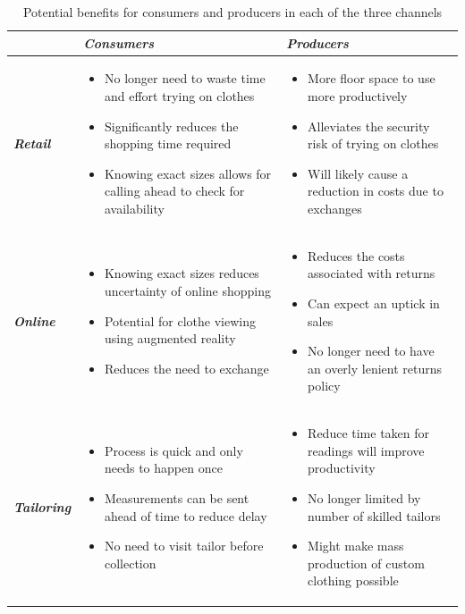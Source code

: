\begin{table}[htbp]
	\centering
	\caption{Potential benefits for consumers and producers in each of the three channels}
	\begin{tabularx}{\textwidth}{|Y|Y|Y|}
		\toprule
		& 
		\textit{\textbf{Consumers}} & 
		\textit{\textbf{Producers}} \\
		\midrule
		\textit{\textbf{Retail}} & 
		\begin{itemize}
			\item No longer need to waste time and effort trying on clothes
			\item Significantly reduces the shopping time required
			\item Knowing exact sizes allows for calling ahead to check for availability
		\end{itemize} & 
		\begin{itemize}
			\item More floor space to use more productively
			\item Alleviates the security risk of trying on clothes
			\item Will likely cause a reduction in costs due to exchanges
		\end{itemize} \\
		\midrule
		\textit{\textbf{Online}} & 
		\begin{itemize}
			\item Knowing exact sizes reduces uncertainty of online shopping
			\item Potential for clothe viewing using augmented reality
			\item Reduces the need to exchange
		\end{itemize} & 
		\begin{itemize}
			\item Reduces the costs associated with returns
			\item Can expect an uptick in sales
			\item No longer need to have an overly lenient returns policy
		\end{itemize}\\
		\midrule
		\textit{\textbf{Tailoring}} & 
		\begin{itemize}
			\item Process is quick and only needs to happen once
			\item Measurements can be sent ahead of time to reduce delay
			\item No need to visit tailor before collection
		\end{itemize} & 
		\begin{itemize}
			\item Reduce time taken for readings will improve productivity
			\item No longer limited by number of skilled tailors
			\item Might make mass production of custom clothing possible
		\end{itemize} \\
		\bottomrule
	\end{tabularx}%
	\label{tab:conProdBenefits}%
\end{table}%


